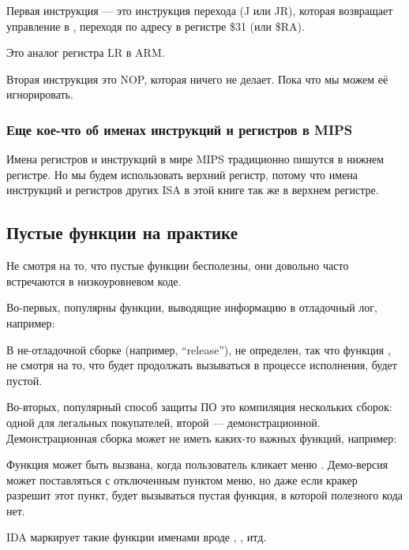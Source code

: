 
Первая инструкция --- это инструкция перехода (J или JR),
которая возвращает управление в , переходя по адресу в регистре \$31 (или \$RA).

Это аналог регистра \ac{LR} в ARM.

Вторая инструкция это \ac{NOP}, которая ничего не делает.
Пока что мы можем её игнорировать.

\subsubsection{Еще кое-что об именах инструкций и регистров в MIPS}
Имена регистров и инструкций в мире MIPS традиционно пишутся в нижнем регистре.
Но мы будем использовать верхний регистр, потому что имена инструкций и регистров других
\ac{ISA} в этой книге так же в верхнем регистре.

\subsection{Пустые функции на практике}

Не смотря на то, что пустые функции бесполезны, они довольно часто встречаются в низкоуровневом коде.

Во-первых, популярны функции, выводящие информацию в отладочный лог, например:



В не-отладочной сборке (например, ``release''),  не определен, так что функция ,
не смотря на то, что будет продолжать вызываться в процессе исполнения, будет пустой.

Во-вторых, популярный способ защиты ПО это компиляция нескольких сборок: одной для легальных покупателей,
второй --- демонстрационной.
Демонстрационная сборка может не иметь каких-то важных функций, например:



Функция  может быть вызвана, когда пользователь кликает меню .
Демо-версия может поставляться с отключенным пунктом меню, но даже если кракер разрешит этот пункт,
будет вызываться пустая функция, в которой полезного кода нет.

IDA маркирует такие функции именами вроде , , итд.

